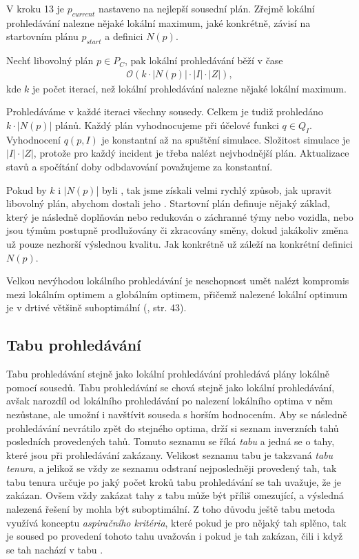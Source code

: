 V kroku 13 je $p_{current}$ nastaveno na nejlepší sousední plán.
Zřejmě lokální prohledávání nalezne nějaké lokální maximum, jaké konkrétně, závisí na startovním plánu $p_{start}$ a definici $N(p)$.

\begin{veta}
  Nechť libovolný plán $p \in P_C$, pak lokální prohledávání běží v čase
  \begin{align*}
    \mathcal{O}(k \cdot |N(p)| \cdot |I| \cdot |Z|),
  \end{align*}
  kde $k$ je počet iterací, než lokální prohledávání nalezne nějaké lokální maximum.
\end{veta}
\begin{dukaz}
  Prohledáváme v každé iteraci všechny sousedy. Celkem je tudiž prohledáno $k \cdot |N(p)|$ plánů.
  Každý plán vyhodnocujeme při účelové funkci $q \in Q_I$. Vyhodnocení $q(p, I)$ je konstantní až na spuštění simulace. 
  Složitost simulace je $|I| \cdot |Z|$, protože pro každý incident je třeba nalézt nejvhodnější plán.
  Aktualizace stavů a spočítání doby odbdavování považujeme za konstantní.
\end{dukaz}

Pokud by $k$ i $|N(p)$| byli , tak jsme získali velmi rychlý způsob, jak upravit libovolný plán, abychom dostali jeho . 
Startovní plán definuje nějaký základ, který je následně doplňován nebo redukován o záchranné týmy nebo vozidla,
nebo jsou týmům postupně prodlužovány či zkracovány směny,
dokud jakákoliv změna už pouze nezhorší výslednou kvalitu. 
Jak konkrétně už záleží na konkrétní definici $N(p)$.

Velkou nevýhodou lokálního prohledávání je neschopnost umět nalézt kompromis mezi lokálním optimem a globálním optimem,
přičemž nalezené lokální optimum je v drtivé většině suboptimální (\citet{GlovKoch03}, str. 43).

\subsection{Tabu prohledávání}\label{kap:tabuSearch}

Tabu prohledávání stejně jako lokální prohledávání prohledává plány lokálně pomocí sousedů.
Tabu prohledávání se chová stejně jako lokální prohledávání, avšak narozdíl od lokálního prohledávání po nalezení lokálního optima v něm nezůstane,
ale umožní i navštívit souseda s horším hodnocením.
Aby se následně prohledávání nevrátilo zpět do stejného optima,
drží si seznam inverzních tahů posledních provedených tahů. Tomuto seznamu se říká \textit{tabu} a jedná se o tahy, které 
jsou při prohledávání zakázany.
Velikost seznamu tabu je takzvaná \textit{tabu tenura}, a jelikož se vždy ze seznamu odstraní nejposledněji provedený tah,
tak tabu tenura určuje po jaký počet kroků tabu prohledávání se tah uvažuje, že je zakázan. 
Ovšem vždy zakázat tahy z tabu může být příliš omezující, a výsledná nalezená řešení by mohla být suboptimální.
Z toho důvodu ještě tabu metoda využívá konceptu \textit{aspiračního kritéria}, které pokud je pro nějaký tah splěno,
tak je soused po provedení tohoto tahu uvažován i pokud je tah zakázan, čili i když se tah nachází v tabu \cite{tabu}.

